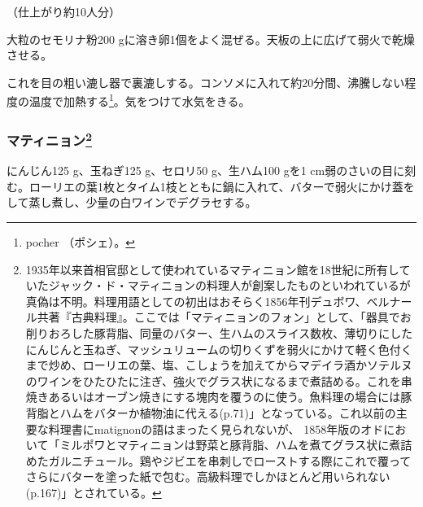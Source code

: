 \begin{recette}
（仕上がり約10人分）

大粒のセモリナ粉200
gに溶き卵1個をよく混ぜる。天板の上に広げて弱火で乾燥させる。

これを目の粗い漉し器で裏漉しする。コンソメに入れて約20分間、沸騰しない程度の温度で加熱する\footnote{pocher
  （ポシェ）。}。気をつけて水気をきる。

\hypertarget{matignon}{%
\subsubsection[マティニョン]{\texorpdfstring{マティニョン\footnote{1935年以来首相官邸として使われているマティニョン館を18世紀に所有していたジャック・ド・マティニョンの料理人が創案したものといわれているが真偽は不明。料理用語としての初出はおそらく1856年刊デュボワ、ベルナール共著『古典料理』。ここでは「マティニョンのフォン」として、「器具でお削りおろした豚背脂、同量のバター、生ハムのスライス数枚、薄切りにしたにんじんと玉ねぎ、マッシュリュームの切りくずを弱火にかけて軽く色付くまで炒め、ローリエの葉、塩、こしょうを加えてからマデイラ酒かソテルヌのワインをひたひたに注ぎ、強火でグラス状になるまで煮詰める。これを串焼きあるいはオーブン焼きにする塊肉を覆うのに使う。魚料理の場合には豚背脂とハムをバターか植物油に代える(p.71)」となっている。これ以前の主要な料理書にmatignonの語はまったく見られないが、
  1858年版のオドにおいて「ミルポワとマティニョンは野菜と豚背脂、ハムを煮てグラス状に煮詰めたガルニチュール。鶏やジビエを串刺しでローストする際にこれで覆ってさらにバターを塗った紙で包む。高級料理でしかほとんど用いられない(p.167)」とされている。}}{マティニョン}}\label{matignon}}


 

にんじん125 g、玉ねぎ125 g、セロリ50 g、生ハム100 gを1
cm弱のさいの目に刻む。ローリエの葉1枚とタイム1枝とともに鍋に入れて、バターで弱火にかけ蓋をして蒸し煮し、少量の白ワインでデグラセする。

\hypertarget{mirepoix}{%
}
\end{recette}
